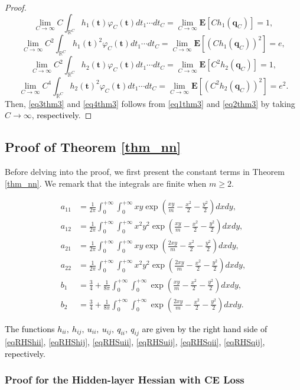 \documentclass{article}
\newcommand{\E}{\mathbf{E}}
\newcommand{\mb}{\mathbb}
\newcommand\mf{\mathbf}
\newcommand{\rw}{\rightarrow}
\newcommand{\1}{^{(1)}}
\newcommand{\2}{^{(2)}}
\renewcommand{\l}{\left}
\renewcommand{\r}{\right}
\newcommand{\bea}{\begin{equation}\begin{aligned}}
\newcommand{\eea}{\end{aligned}\end{equation}}
\newcommand{\zhaoruirevise}[1]{\textcolor{black}{ #1}}
\begin{document}
\begin{proof}
 $$
\lim_{C\rw\infty}C\int_{\mb{R}^C}h_1(\mf{t})\varphi_C(\mf{t})dt_1\cdots dt_C=\lim_{C\rw\infty}\E\l[Ch_1(\mf{q}_C)\r]=1,
 $$
 $$
\lim_{C\rw\infty}C^2\int_{\mb{R}^C}h_1(\mf{t})^2\varphi_C(\mf{t})dt_1\cdots dt_C=\lim_{C\rw\infty}\E\l[(Ch_1(\mf{q}_C))^2\r]=e,
 $$
 $$
\lim_{C\rw\infty}C^2\int_{\mb{R}^C}h_2(\mf{t})\varphi_C(\mf{t})dt_1\cdots dt_C=\lim_{C\rw\infty}\E\l[C^2h_2(\mf{q}_C)\r]=1,
 $$
 $$
\lim_{C\rw\infty}C^4\int_{\mb{R}^C}h_2(\mf{t})^2\varphi_C(\mf{t})dt_1\cdots dt_C=\lim_{C\rw\infty}\E\l[(C^2h_2(\mf{q}_C))^2\r]=e^2.
 $$
 Then, \eqref{eq3thm3} and \eqref{eq4thm3} follows from \eqref{eq1thm3} and \eqref{eq2thm3} by taking $C\rw\infty$, \zhaoruirevise{respectively}.
\end{proof}

\subsection{Proof of Theorem \ref{thm_nn}}
\label{appendix_thm2}

Before delving into the proof, we first present the constant terms in Theorem \ref{thm_nn}. We remark that the integrals are finite when $m \geq 2$.

\bea
\label{eq_constant_terms_Hvv}
a_{11}&=\frac{1}{2\pi}\int_0^{+\infty}\int_0^{+\infty}xy\exp\l(\frac{xy}{m}-\frac{x^2}{2}-\frac{y^2}{2}\r)dxdy,\\
a_{12}&=\frac{1}{2\pi}\int_0^{+\infty}\int_0^{+\infty}x^2y^2\exp\l(\frac{xy}{m}-\frac{x^2}{2}-\frac{y^2}{2}\r)dxdy,\\
a_{21}&=\frac{1}{2\pi}\int_0^{+\infty}\int_0^{+\infty}xy\exp\l(\frac{2xy}{m}-\frac{x^2}{2}-\frac{y^2}{2}\r)dxdy,\\
a_{22}&=\frac{1}{2\pi}\int_0^{+\infty}\int_0^{+\infty}x^2y^2\exp\l(\frac{2xy}{m}-\frac{x^2}{2}-\frac{y^2}{2}\r)dxdy,\\
b_1&=\frac{3}{4}+\frac{1}{8\pi}\int_0^{+\infty}\int_0^{+\infty}\exp\l(\frac{xy}{m}-\frac{x^2}{2}-\frac{y^2}{2}\r)dxdy,\\
b_2&=\frac{3}{4}+\frac{1}{8\pi}\int_0^{+\infty}\int_0^{+\infty}\exp\l(\frac{2xy}{m}-\frac{x^2}{2}-\frac{y^2}{2}\r)dxdy.
\eea

\zhaoruirevise{The functions $h_{ii},\ h_{ij},\ u_{ii},\ u_{ij},\ q_{ii},\ q_{ij}$ are given by the right hand side of \eqref{eqRHShii},  \eqref{eqRHShij}, \eqref{eqRHSuii},  \eqref{eqRHSuij}, \eqref{eqRHSqii}, \eqref{eqRHSqij}, repectively.}

\subsubsection{Proof for the Hidden-layer Hessian with CE Loss}
\label{appendix_hidden_weights_ce}
\end{document}
